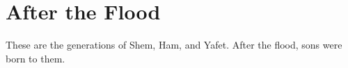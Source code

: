 \chapter{After the Flood}

These are the generations of Shem, Ham, and Yafet.
After the flood, sons were born to them.